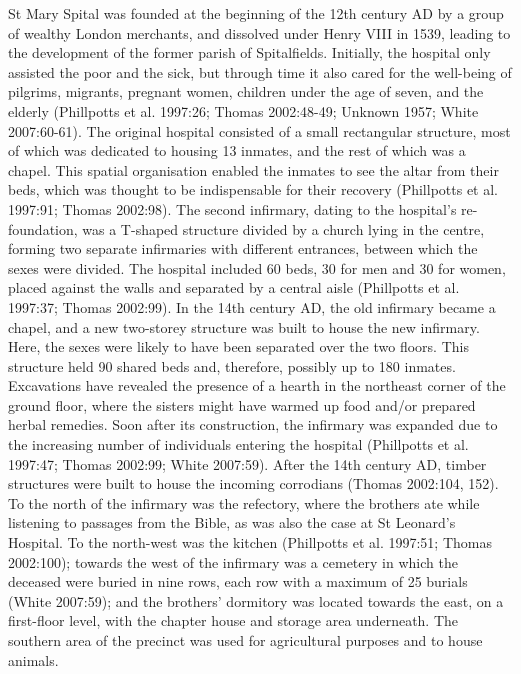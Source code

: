 \documentclass[%
	]{ijsra}
\begin{document}
St Mary Spital was founded at the beginning of the 12th century AD by a group of wealthy London merchants, and dissolved under Henry VIII in 1539, leading to the development of the former parish of Spitalfields. Initially, the hospital only assisted the poor and the sick, but through time it also cared for the well-being of pilgrims, migrants, pregnant women, children under the age of seven, and the elderly (Phillpotts et al. 1997:26; Thomas 2002:48-49; Unknown 1957; White 2007:60-61). 
The original hospital consisted of a small rectangular structure, most of which was dedicated to housing 13 inmates, and the rest of which was a chapel. This spatial organisation enabled the inmates to see the altar from their beds, which was thought to be indispensable for their recovery (Phillpotts et al. 1997:91; Thomas 2002:98).
The second infirmary, dating to the hospital’s re-foundation, was a T-shaped structure divided by a church lying in the centre, forming two separate infirmaries with different entrances, between which the sexes were divided. The hospital included 60 beds, 30 for men and 30 for women, placed against the walls and separated by a central aisle (Phillpotts et al. 1997:37; Thomas 2002:99). 
In the 14th century AD, the old infirmary became a chapel, and a new two-storey structure was built to house the new infirmary. Here, the sexes were likely to have been separated over the two floors. This structure held 90 shared beds and, therefore, possibly up to 180 inmates.
Excavations have revealed the presence of a hearth in the northeast corner of the ground floor, where the sisters might have warmed up food and/or prepared herbal remedies. Soon after its construction, the infirmary was expanded due to the increasing number of individuals entering the hospital (Phillpotts et al. 1997:47; Thomas 2002:99; White 2007:59). After the 14th century AD, timber structures were built to house the incoming corrodians (Thomas 2002:104, 152).
To the north of the infirmary was the refectory, where the brothers ate while listening to passages from the Bible, as was also the case at St Leonard’s Hospital. To the north-west was the kitchen (Phillpotts et al. 1997:51; Thomas 2002:100); towards the west of the infirmary was a cemetery in which the deceased were buried in nine rows, each row with a maximum of 25 burials (White 2007:59); and the brothers’ dormitory was located towards the east, on a first-floor level, with the chapter house and storage area underneath. The southern area of the precinct was used for agricultural purposes and to house animals.
\end{document}
